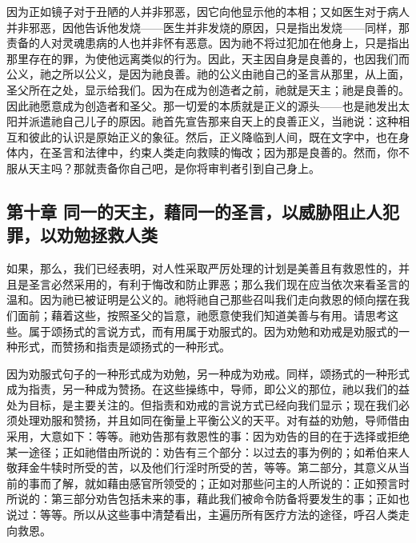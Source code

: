 因为正如镜子对于丑陋的人并非邪恶，因它向他显示他的本相；又如医生对于病人并非邪恶，因他告诉他发烧——医生并非发烧的原因，只是指出发烧——同样，那责备的人对灵魂患病的人也并非怀有恶意。因为祂不将过犯加在他身上，只是指出那里存在的罪，为使他远离类似的行为。因此，天主因自身是良善的，也因我们而公义，祂之所以公义，是因为祂良善。祂的公义由祂自己的圣言从那里，从上面，圣父所在之处，显示给我们。因为在成为创造者之前，祂就是天主；祂是良善的。因此祂愿意成为创造者和圣父。那一切爱的本质就是正义的源头——也是祂发出太阳并派遣祂自己儿子的原因。祂首先宣告那来自天上的良善正义，当祂说：这种相互和彼此的认识是原始正义的象征。然后，正义降临到人间，既在文字中，也在身体内，在圣言和法律中，约束人类走向救赎的悔改；因为那是良善的。然而，你不服从天主吗？那就责备你自己吧，是你将审判者引到自己身上。\par


\subsection{第十章 同一的天主，藉同一的圣言，以威胁阻止人犯罪，以劝勉拯救人类}

如果，那么，我们已经表明，对人性采取严厉处理的计划是美善且有救恩性的，并且是圣言必然采用的，有利于悔改和防止罪恶；那么我们现在应当依次来看圣言的温和。因为祂已被证明是公义的。祂将祂自己那些召叫我们走向救恩的倾向摆在我们面前；藉着这些，按照圣父的旨意，祂愿意使我们知道美善与有用。请思考这些。属于颂扬式的言说方式，而有用属于劝服式的。因为劝勉和劝戒是劝服式的一种形式，而赞扬和指责是颂扬式的一种形式。\par

因为劝服式句子的一种形式成为劝勉，另一种成为劝戒。同样，颂扬式的一种形式成为指责，另一种成为赞扬。在这些操练中，导师，即公义的那位，祂以我们的益处为目标，是主要关注的。但指责和劝戒的言说方式已经向我们显示；现在我们必须处理劝服和赞扬，并且如同在衡量上平衡公义的天平。对有益的劝勉，导师借由采用，大意如下：等等。祂劝告那有救恩性的事：因为劝告的目的在于选择或拒绝某一途径；正如祂借由所说的：劝告有三个部分：以过去的事为例的；如希伯来人敬拜金牛犊时所受的苦，以及他们行淫时所受的苦，等等。第二部分，其意义从当前的事而了解，就如藉由感官所领受的；正如对那些问主的人所说的：正如预言时所说的：第三部分劝告包括未来的事，藉此我们被命令防备将要发生的事；正如也说过：等等。所以从这些事中清楚看出，主遍历所有医疗方法的途径，呼召人类走向救恩。\par

